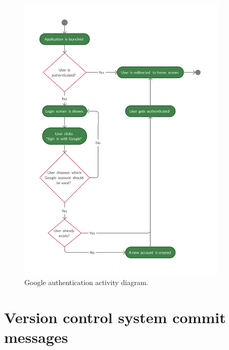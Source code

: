 \documentclass[
  printed, %
  table,   %
  oneside, %
  lof,     %
  lot,     %
]{fithesis3}
\begin{document}
    \newpage
    \begin{figure}[H]
        \begin{center}
            \includegraphics[width=0.9\textwidth]{figures/diagrams/google_auth_flow}
        \end{center}
        \caption{Google authentication activity diagram.}
        \label{fig:google_auth_flow}
    \end{figure}
    
\newpage
\section{Version control system commit messages}
\end{document}
